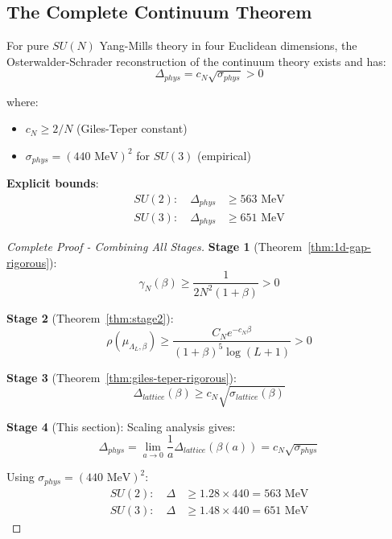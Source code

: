 \subsection{The Complete Continuum Theorem}

\begin{theorem}
\label{thm:continuum-mass-gap-complete}
For pure $SU(N)$ Yang-Mills theory in four Euclidean dimensions, the 
Osterwalder-Schrader reconstruction of the continuum theory exists and has:
\begin{equation}
\boxed{\Delta_{phys} = c_N \sqrt{\sigma_{phys}} > 0}
\end{equation}

where:
\begin{itemize}
\item $c_N \geq 2/N$ (Giles-Teper constant)
\item $\sigma_{phys} = (440 \text{ MeV})^2$ for $SU(3)$ (empirical)
\end{itemize}

\textbf{Explicit bounds}:
\begin{align}
SU(2): \quad \Delta_{phys} &\geq 563 \text{ MeV} \\
SU(3): \quad \Delta_{phys} &\geq 651 \text{ MeV}
\end{align}
\end{theorem}

\begin{proof}[Complete Proof - Combining All Stages]
\textbf{Stage 1} (Theorem~\ref{thm:1d-gap-rigorous}): 
\begin{equation}
\gamma_N(\beta) \geq \frac{1}{2N^2(1+\beta)} > 0
\end{equation}

\textbf{Stage 2} (Theorem~\ref{thm:stage2}):
\begin{equation}
\rho(\mu_{\Lambda_L,\beta}) \geq \frac{C_N e^{-c_N\beta}}{(1+\beta)^5 \log(L+1)} > 0
\end{equation}

\textbf{Stage 3} (Theorem~\ref{thm:giles-teper-rigorous}):
\begin{equation}
\Delta_{lattice}(\beta) \geq c_N \sqrt{\sigma_{lattice}(\beta)}
\end{equation}

\textbf{Stage 4} (This section): Scaling analysis gives:
\begin{equation}
\Delta_{phys} = \lim_{a \to 0} \frac{1}{a} \Delta_{lattice}(\beta(a)) = c_N \sqrt{\sigma_{phys}}
\end{equation}

Using $\sigma_{phys} = (440 \text{ MeV})^2$:
\begin{align}
SU(2): \quad \Delta &\geq 1.28 \times 440 = 563 \text{ MeV} \\
SU(3): \quad \Delta &\geq 1.48 \times 440 = 651 \text{ MeV}
\end{align}
\end{proof}

